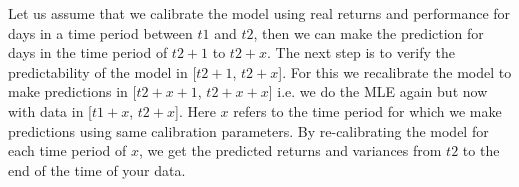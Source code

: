Let us assume that we calibrate the model using real returns and performance for days in a time period between $t1$ and $t2$, then we can make the prediction for days in the time period of $t2+1$ to $t2+x$. The next step is to verify the predictability of the model in [$t2+1$, $t2+x$]. For this we recalibrate the model to make predictions in [$t2+x+1$, $t2+x+x$] i.e. we do the MLE again but now with data in [$t1+x$, $t2+x$]. Here $x$ refers to the time period for which we make predictions using same calibration parameters. By re-calibrating the model for each time period of $x$, we get the predicted returns and variances from $t2$ to the end of the time of your data.